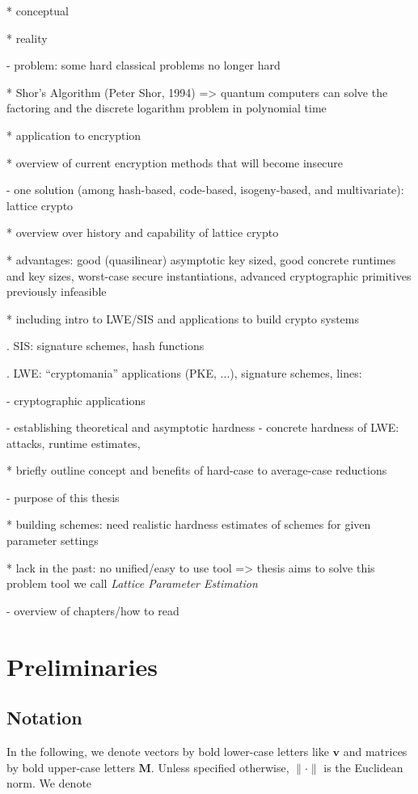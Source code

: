 \documentclass[
  a4paper,  %
  twoside,  %
  bibliography=totoc,
  headsepline,
  cleardoublepage=empty,
  parskip=half,
  draft=false
]{scrbook}
\begin{document}
  * conceptual

  * reality


- problem: some hard classical problems no longer hard

  * Shor's Algorithm (Peter Shor, 1994) %
    => quantum computers can solve the factoring and the discrete logarithm problem in polynomial time

  * application to encryption

  * overview of current encryption methods that will become insecure


- one solution (among hash-based, code-based, isogeny-based, and multivariate): lattice crypto

  * overview over history and capability of lattice crypto

  * advantages: good (quasilinear) asymptotic key sized, good concrete runtimes and key sizes, worst-case secure instantiations, advanced cryptographic primitives previously infeasible

  * including intro to LWE/SIS and applications to build crypto systems

    . SIS: signature schemes, hash functions

    . LWE: ``cryptomania'' applications (PKE, ...), signature schemes, lines:

      - cryptographic applications

      - establishing theoretical and asymptotic hardness \cite{Reg05} %
        \cite{BLPRS13, MP13} 
      - concrete hardness of LWE: attacks, runtime estimates, 

  * briefly outline concept and benefits of hard-case to average-case reductions


- purpose of this thesis

  * building schemes: need realistic hardness estimates of schemes for given parameter settings

  * lack in the past: no unified/easy to use tool => thesis aims to solve this problem
    tool we call \textit{Lattice Parameter Estimation} 


- overview of chapters/how to read



\chapter{Preliminaries} \label{chap:Preliminaries}

\section{Notation}
In the following, we denote vectors by bold lower-case letters like $\textbf{v}$ and matrices by bold upper-case letters $\textbf{M}$. Unless specified otherwise, $\| \cdot \|$ is the Euclidean norm. We denote %
\end{document}
